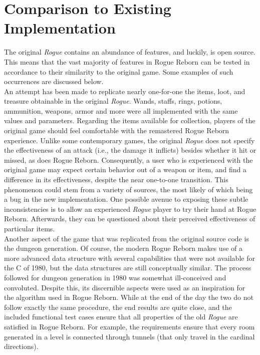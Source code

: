 \documentclass[12pt, titlepage]{article}
\newcommand{\rev}[1]{\textcolor{RevisionColour}{#1}}
\begin{document}
\newpage
\section{Comparison to Existing Implementation}	
\label{section5}
	
	The original \textit{Rogue} contains an abundance of features, and luckily, is open source.  This means that the vast majority of features in Rogue Reborn can be tested in accordance to their similarity to the original game. Some examples of such occurrences are discussed below.\\

	An attempt has been made to replicate nearly one-for-one the items, loot, and treasure obtainable in the original \textit{Rogue}.  Wands, staffs, rings, potions, ammunition, weapons, armor and more were all implemented with the same values and parameters.  Regarding the items available for collection, players of the original game should feel comfortable with the remastered Rogue Reborn experience.  Unlike some contemporary games, the original \textit{Rogue} does not specify the effectiveness of an attack \rev{(i.e., the damage it inflicts)} besides whether it hit or missed, as does Rogue Reborn.  Consequently, a user who is experienced with the original game may expect certain behavior out of a weapon or item, and find a difference in its effectiveness, despite the near one-to-one transition.  This phenomenon could stem from a variety of sources, the most likely of which being a bug in the new implementation.  \rev{One possible avenue to exposing these subtle inconsistencies is to allow an experienced \textit{Rogue} player to try their hand at Rogue Reborn.  Afterwards, they can be questioned about their perceived effectiveness of particular items.}\\

	Another aspect of the game that was replicated from the original source code is the dungeon generation.  Of course, the modern Rogue Reborn makes use of a more advanced data structure with several capabilities that were not available for the C of 1980, but the data structures are still conceptually similar.  The process followed for dungeon generation in 1980 was somewhat ill-conceived and convoluted.  Despite this, its discernible aspects were used as an inspiration for the algorithm used in Rogue Reborn.  While at the end of the day the two do not follow exactly the same procedure, the end results are quite close, and the included functional test cases ensure that all properties of the old \textit{Rogue} are satisfied in Rogue Reborn.  \rev{For example, the requirements ensure that every room generated in a level is connected through tunnels (that only travel in the cardinal directions).}\\
\end{document}
